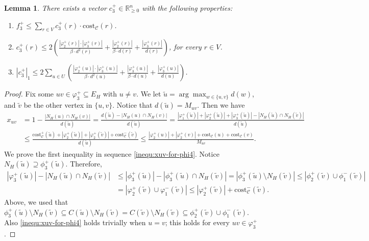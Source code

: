 \documentclass[11pt]{article}
\newcommand{\R}{\mathbb{R}}
\newcommand{\cost}{\mathrm{cost}}
\newtheorem{lemma}[theorem]{Lemma}
\newcommand{\calC}{{\mathcal{C}}}
\begin{document}
\begin{CJK*}{UTF8}{gbsn}
\begin{lemma}
    \label{lemma:f+3}
    There exists a vector $c^+_3 \in \R_{\geq 0}^{n}$ with the following properties:
    \begin{enumerate}[label=(\ref{lemma:f+3}\alph*)]
        \item \label{property:f+3-cost} $f^+_3 \leq \sum_{r \in V}c^+_3(r)\cdot \cost_\calC(r)$.
        \item \label{property:f+3-c+3-infty} $c^+_3(r) \leq 2\left(\frac{|\varphi^+_2(r)|\cdot |\varphi^+_3(r)|}{\beta\cdot d^2(r)}  + \frac{|\varphi^+_2(r)|}{\beta\cdot d(r)} + \frac{|\varphi^+_3(r)|}{d(r)}\right)$, for every $r \in V$.
        \item \label{property:f+3-c+3-1} $|c^+_3|_1 \leq 2 \sum_{u \in U} \left(\frac{|\varphi^+_2(u)|\cdot|\varphi^+_3(u)|}{\beta \cdot d^2(u)} + \frac{|\varphi^+_3(u)|}{\beta \cdot d(u)} + \frac{|\varphi^+_3(u)|}{d(u)}\right)$.
    \end{enumerate}
\end{lemma}
\begin{proof}
Fix some $uv \in \varphi^+_3 \subseteq E_H$ with $u \neq v$. We let $\tilde u = \arg\max_{w \in \{u, v\}} d(w)$, and $\tilde v$ be the other vertex in $\{u, v\}$. Notice that $d(\tilde u) = M_{uv}$. Then we have
\begin{align}
    x_{uv} &= 1 - \frac{|N_{H}(u) \cap N_{H}(v)|}{d(\tilde u)} = \frac{d(\tilde u) - |N_{H}(u) \cap N_{H}(v)|}{d(\tilde u)}  = \frac{|\varphi^+_1({\tilde u})| + |\varphi^+_2({\tilde u})| + |\varphi^+_3({\tilde u})| - |N_H(\tilde u) \cap N_H(\tilde v)|}{d({\tilde u})} \nonumber\\
&\leq \frac{\cost^{+}_{\mathcal{C}}({\tilde u}) + |\varphi^+_2({\tilde u})| + |\varphi^+_2({\tilde v})| + \cost^{-}_{\mathcal{C}}({\tilde v})}{d({\tilde u})} \leq \frac{|\varphi^+_2(u)| + |\varphi^+_2(v)| +  \cost_{\mathcal{C}}(u)+ \cost_{\mathcal{C}}(v)}{M_{uv}}. \label{inequ:xuv-for-phi4}
\end{align}
We prove the first inequality in sequence \eqref{inequ:xuv-for-phi4}.
Notice $N_H(\tilde u) \supseteq \phi^+_3(\tilde u)$. Therefore, 
\begin{align*}
    |\varphi^+_3({\tilde u})| - |N_H(\tilde u) \cap N_H(\tilde v)| &\leq |\phi^+_3({\tilde u})| - |\phi^+_3(\tilde u) \cap N_H(\tilde v)| = |\phi^+_3(\tilde u) \setminus N_H(\tilde v)| \leq |\phi^+_2(\tilde v) \cup \phi^-_1(\tilde v)|\\
    &= |\varphi^+_2(\tilde v) \cup \varphi^-_1(\tilde v)|\leq |\varphi^+_2(\tilde v)| + \cost^-_\calC(\tilde v).
\end{align*}
Above, we used that $\phi^+_3(\tilde u) \setminus N_H(\tilde v) \subseteq C(\tilde u) \setminus N_H(\tilde v) = C(\tilde v) \setminus N_H(\tilde v) \subseteq \phi^+_2(\tilde v) \cup \phi^-_1(\tilde v)$.  Also \eqref{inequ:xuv-for-phi4} holds trivially when $u = v$; this holds for every $uv \in \varphi^+_3$.
\medskip


\end{proof}
\end{CJK*}
\end{document}
